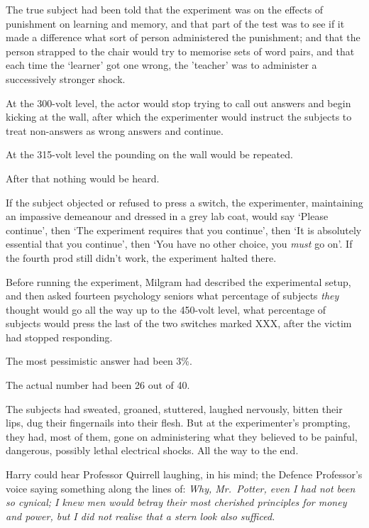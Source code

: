 The true subject had been told that the experiment was on the effects of
punishment on learning and memory, and that part of the test was to see
if it made a difference what sort of person administered the punishment;
and that the person strapped to the chair would try to memorise sets of
word pairs, and that each time the `learner' got one wrong, the
'teacher' was to administer a successively stronger shock.

At the 300-volt level, the actor would stop trying to call out answers
and begin kicking at the wall, after which the experimenter would
instruct the subjects to treat non-answers as wrong answers and
continue.

At the 315-volt level the pounding on the wall would be repeated.

After that nothing would be heard.

If the subject objected or refused to press a switch, the experimenter,
maintaining an impassive demeanour and dressed in a grey lab coat, would
say `Please continue', then `The experiment requires that you continue',
then `It is absolutely essential that you continue', then `You have no
other choice, you \emph{must} go on'. If the fourth prod still didn't
work, the experiment halted there.

Before running the experiment, Milgram had described the experimental
setup, and then asked fourteen psychology seniors what percentage of
subjects \emph{they} thought would go all the way up to the 450-volt
level, what percentage of subjects would press the last of the two
switches marked XXX, after the victim had stopped responding.

The most pessimistic answer had been 3\%.

The actual number had been 26 out of 40.

The subjects had sweated, groaned, stuttered, laughed nervously, bitten
their lips, dug their fingernails into their flesh. But at the
experimenter's prompting, they had, most of them, gone on administering
what they believed to be painful, dangerous, possibly lethal electrical
shocks. All the way to the end.

Harry could hear Professor Quirrell laughing, in his mind; the Defence
Professor's voice saying something along the lines of: \emph{Why,
Mr.~Potter, even I had not been so cynical; I knew men would betray
their most cherished principles for money and power, but I did not
realise that a stern look also sufficed.}

